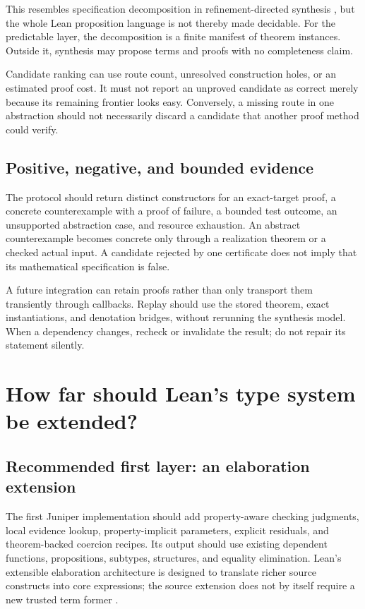 \documentclass[11pt,a4paper]{article}
\theoremstyle{definition}\newtheorem{definition}[theorem]{Definition}
\theoremstyle{remark}\newtheorem{remark}[theorem]{Remark}
\begin{document}
This resembles specification decomposition in refinement-directed synthesis \cite{synquid}, but the whole Lean proposition language is not thereby made decidable. For the predictable layer, the decomposition is a finite manifest of theorem instances. Outside it, synthesis may propose terms and proofs with no completeness claim.

Candidate ranking can use route count, unresolved construction holes, or an estimated proof cost. It must not report an unproved candidate as correct merely because its remaining frontier looks easy. Conversely, a missing route in one abstraction should not necessarily discard a candidate that another proof method could verify.

\subsection{Positive, negative, and bounded evidence}
The protocol should return distinct constructors for an exact-target proof, a concrete counterexample with a proof of failure, a bounded test outcome, an unsupported abstraction case, and resource exhaustion. An abstract counterexample becomes concrete only through a realization theorem or a checked actual input. A candidate rejected by one certificate does not imply that its mathematical specification is false.

A future integration can retain proofs rather than only transport them transiently through callbacks. Replay should use the stored theorem, exact instantiations, and denotation bridges, without rerunning the synthesis model. When a dependency changes, recheck or invalidate the result; do not repair its statement silently.

\section{How far should Lean's type system be extended?}
\label{sec:kernel}
\subsection{Recommended first layer: an elaboration extension}
The first Juniper implementation should add property-aware checking judgments, local evidence lookup, property-implicit parameters, explicit residuals, and theorem-backed coercion recipes. Its output should use existing dependent functions, propositions, subtypes, structures, and equality elimination. Lean's extensible elaboration architecture is designed to translate richer source constructs into core expressions; the source extension does not by itself require a new trusted term former \cite{leanElab}.
\end{document}
